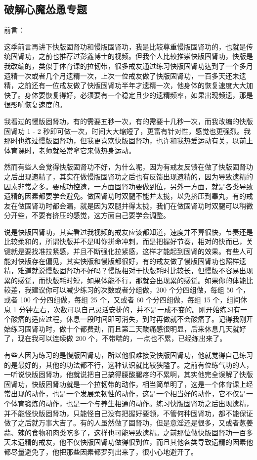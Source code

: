 \subsection{破解心魔怂恿专题}

前言：

这季前言再讲下快版固肾功和慢版固肾功，我是比较尊重慢版固肾功的，也就是传统固肾功，之前也推荐过彭鑫博士的视频。但我个人比较推崇快版固肾功，快版是我改编的，类似于体育课的拉韧带，很多戒友通过练习快版固肾功达到了一个多月遗精一次或者几个月遗精一次，上次一位戒友做了快版固肾功，一百多天还未遗精，之前还有一位戒友做了快版固肾功半年才遗精一次，他身体的恢复速度大大加快了。身体要恢复得好，必须要有一个稳定且少的遗精频率，如果出现频遗，那是很影响恢复速度的。

我看过的慢版固肾功，有的需要五秒一次，有的需要十几秒一次，而我改编的快版固肾功 1 - 2 秒即可做一次，时间大大缩短了，更富有针对性，感觉也更强烈。我那时也练过慢版固肾功，但我更喜欢快版固肾功，也许和我热爱运动有关，以前上体育课时，老师就经常拿它来做热身运动。

然而有些人会觉得快版固肾功不好，为什么呢，因为有戒友反馈在做了快版固肾功之后出现遗精了，其实在做慢版固肾功之后也有反馈出现遗精的，因为导致遗精的因素非常之多。要成功控遗，一方面固肾功要做到位，另外一方面，就是各类导致遗精的因素都要学会避免。做固肾功时双腿不能并太拢，以免挤压到睾丸，有的戒友在做固肾功时都会漏，就是因为双腿并得太拢，我们在做固肾功时双腿可以稍微分开些，不要有挤压的感觉，这方面自己要学会调整。

说是快版固肾功，其实看过我视频的戒友应该都知道，速度并不算很快，节奏还是比较柔和的，所谓快版并不是叫你拼命冲刺，而是把握好节奏，相对的快而已，关键就是要找准拉紧感，并且不断强化拉紧感，这样才能起到固肾的效果。有些人可能对快版存在偏见，其实快版和慢版都很好，有的戒友做了慢版固肾功也照样遗精，难道就说慢版固肾功不好吗？慢版相对于快版耗时比较长，但慢版不容易出现累的感觉，而快版耗时短，如果体能不行，那就会出现累的感觉。如果你的体能比较差，我建议你可以减少练习的次数或者分组做，200 个分四组做，每组 50 个，或者 100 个分四组做，每组 25 个，又或者 60 个分四组做，每组 15 个，组间休息 1 分钟左右，次数可以自己灵活安排的，并不是一成不变的。刚开始练习有一个酸痛的适应过程，休息一段时间即可消失，到时再做就不会酸痛了。记得我刚开始练习固肾功时，做十个都费劲，而且第二天酸痛感很明显，后来休息几天就好了，现在我可以连续做 200 个，不带喘的，一点也不累，已经练出来了。

有些人因为练习的是慢版固肾功，所以他很难接受快版固肾功，他就觉得自己练习的是最好的，其他的功法都不行，这种认识就比较狭隘了。之前有位练气功的人，一听说快版固肾功，他就说把自己搞得腰酸腿疼的不累啊，其实他完全误解了快版固肾功，快版固肾功就是一个拉韧带的动作，相当简单明了，这是一个体育课上经常出现的动作，也是一个发展柔韧性的动作，这是一个相当好的动作，它不仅是一个体育锻炼的动作，也是一个与养生相通的动作。练习快版固肾功之后出现遗精，并不能怪快版固肾功，只能怪自己没有把握好要领，不管何种固肾功，都不能保证做了之后就万事大吉了。有的人虽然做了固肾功，但是意淫还是很多，又或者葱姜蒜、辣的食物和肉类吃多了，这样也可能导致遗精。之前那位做快版固肾功一百多天未遗精的戒友，他不仅快版固肾功做得很到位，而且其他各类导致遗精的因素他都尽量避免了，他把那些因素都罗列出来了，很小心地避开了。

